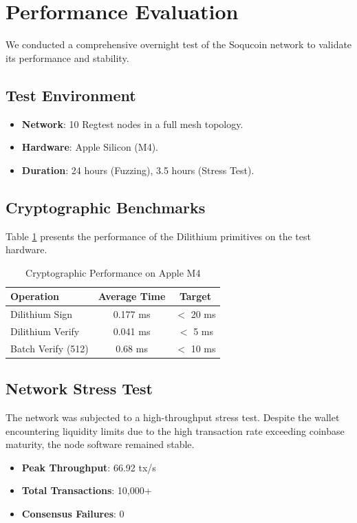 \documentclass[10pt, twocolumn]{article}
\begin{document}
\section{Performance Evaluation}

We conducted a comprehensive overnight test of the Soqucoin network to validate its performance and stability.

\subsection{Test Environment}
\begin{itemize}
    \item \textbf{Network}: 10 Regtest nodes in a full mesh topology.
    \item \textbf{Hardware}: Apple Silicon (M4).
    \item \textbf{Duration}: 24 hours (Fuzzing), 3.5 hours (Stress Test).
\end{itemize}

\subsection{Cryptographic Benchmarks}
Table \ref{tab:crypto_bench} presents the performance of the Dilithium primitives on the test hardware.

\begin{table}[h]
\centering
\begin{tabular}{@{}lcc@{}}
\toprule
\textbf{Operation} & \textbf{Average Time} & \textbf{Target} \\ \midrule
Dilithium Sign & 0.177 ms & $<$ 20 ms \\
Dilithium Verify & 0.041 ms & $<$ 5 ms \\
Batch Verify (512) & 0.68 ms & $<$ 10 ms \\ \bottomrule
\end{tabular}
\caption{Cryptographic Performance on Apple M4}
\label{tab:crypto_bench}
\end{table}

\subsection{Network Stress Test}
The network was subjected to a high-throughput stress test. Despite the wallet encountering liquidity limits due to the high transaction rate exceeding coinbase maturity, the node software remained stable.

\begin{itemize}
    \item \textbf{Peak Throughput}: 66.92 tx/s
    \item \textbf{Total Transactions}: 10,000+
    \item \textbf{Consensus Failures}: 0
\end{itemize}
\end{document}
